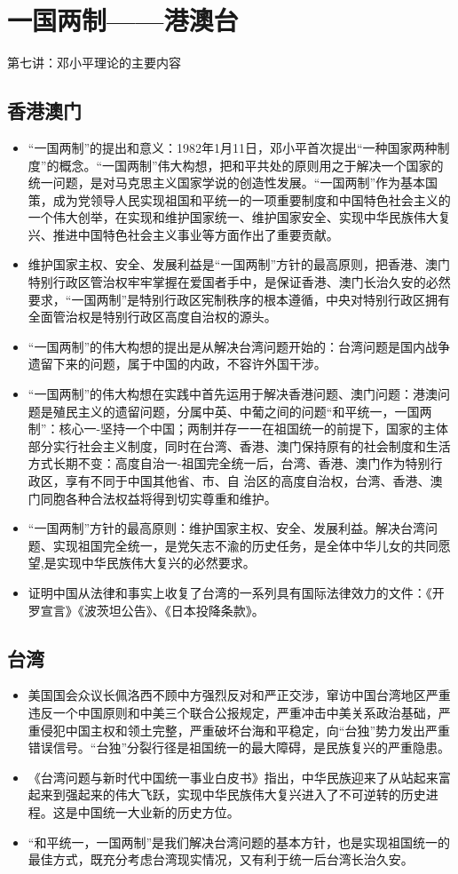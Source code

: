 \documentclass[12pt,openany]{ctexbook}
\begin{document}
\section{一国两制——港澳台}
第七讲：邓小平理论的主要内容
\subsection{香港澳门}
\begin{itemize}
  \item “一国两制”的提出和意义：1982年1月11日，邓小平首次提出“一种国家两种制度”的概念。“一国两制”伟大构想，把和平共处的原则用之于解决一个国家的统一问题，是对马克思主义国家学说的创造性发展。“一国两制”作为基本国策，成为党领导人民实现祖国和平统一的一项重要制度和中国特色社会主义的一个伟大创举，在实现和维护国家统一、维护国家安全、实现中华民族伟大复兴、推进中国特色社会主义事业等方面作出了重要贡献。
  \item 维护国家主权、安全、发展利益是“一国两制”方针的最高原则，把香港、澳门特别行政区管治权牢牢掌握在爱国者手中，是保证香港、澳门长治久安的必然要求，“一国两制”是特别行政区宪制秩序的根本遵循，中央对特别行政区拥有全面管治权是特别行政区高度自治权的源头。
  \item “一国两制”的伟大构想的提出是从解决台湾问题开始的：台湾问题是国内战争遗留下来的问题，属于中国的内政，不容许外国干涉。
  \item “一国两制”的伟大构想在实践中首先运用于解决香港问题、澳门问题：港澳问题是殖民主义的遗留问题，分属中英、中葡之间的问题“和平统一，一国两制”：核心一-坚持一个中国；两制并存一一在祖国统一的前提下，国家的主体部分实行社会主义制度，同时在台湾、香港、澳门保持原有的社会制度和生活方式长期不变：高度自治一-祖国完全统一后，台湾、香港、澳门作为特别行政区，享有不同于中国其他省、市、自 治区的高度自治权，台湾、香港、澳门同胞各种合法权益将得到切实尊重和维护。
  \item “一国两制”方针的最高原则：维护国家主权、安全、发展利益。解决台湾问题、实现祖国完全统一，是党矢志不渝的历史任务，是全体中华儿女的共同愿望,是实现中华民族伟大复兴的必然要求。
  \item 证明中国从法律和事实上收复了台湾的一系列具有国际法律效力的文件：《开罗宣言》《波茨坦公告》、《日本投降条款》。
\end{itemize}
\subsection{台湾}
\begin{itemize}
  \item 美国国会众议长佩洛西不顾中方强烈反对和严正交涉，窜访中国台湾地区严重违反一个中国原则和中美三个联合公报规定，严重冲击中美关系政治基础，严重侵犯中国主权和领土完整，严重破坏台海和平稳定，向“台独”势力发出严重错误信号。“台独”分裂行径是祖国统一的最大障碍，是民族复兴的严重隐患。
  \item 《台湾问题与新时代中国统一事业白皮书》指出，中华民族迎来了从站起来富起来到强起来的伟大飞跃，实现中华民族伟大复兴进入了不可逆转的历史进程。这是中国统一大业新的历史方位。
  \item “和平统一，一国两制”是我们解决台湾问题的基本方针，也是实现祖国统一的最佳方式，既充分考虑台湾现实情况，又有利于统一后台湾长治久安。
\end{itemize}
\end{document}
